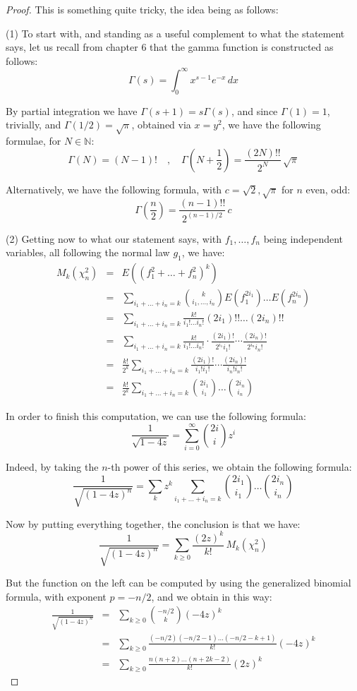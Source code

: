 \documentclass[12pt]{amsbook}
\begin{document}
\begin{proof}
This is something quite tricky, the idea being as follows:

\medskip

(1) To start with, and standing as a useful complement to what the statement says, let us recall from chapter 6 that the gamma function is constructed as follows:
$$\Gamma(s)=\int_0^\infty x^{s-1}e^{-x}\,dx$$

By partial integration we have $\Gamma(s+1)=s\Gamma(s)$, and since $\Gamma(1)=1$, trivially, and $\Gamma(1/2)=\sqrt{\pi}$, obtained via $x=y^2$, we have the following formulae, for $N\in\mathbb N$:
$$\Gamma(N)=(N-1)!\quad,\quad\Gamma\left(N+\frac{1}{2}\right)=\frac{(2N)!!}{2^N}\,\sqrt{\pi}$$

Alternatively, we have the following formula, with $c=\sqrt{2},\sqrt{\pi}$ for $n$ even, odd:
$$\Gamma\left(\frac{n}{2}\right)=\frac{(n-1)!!}{2^{(n-1)/2}}\,c$$

(2) Getting now to what our statement says, with $f_1,\ldots,f_n$ being independent variables, all following the normal law $g_1$, we have:
\begin{eqnarray*}
M_k(\chi_n^2)
&=&E((f_1^2+\ldots+f_n^2)^k)\\
&=&\sum_{i_1+\ldots+i_n=k}\binom{k}{i_1,\ldots,i_n}E(f_1^{2i_1})\ldots E(f_n^{2i_n})\\
&=&\sum_{i_1+\ldots+i_n=k}\frac{k!}{i_1!\ldots i_n!}(2i_1)!!\ldots(2i_n)!!\\
&=&\sum_{i_1+\ldots+i_n=k}\frac{k!}{i_1!\ldots i_n!}\cdot\frac{(2i_1)!}{2^{i_1}i_1!}\cdots\frac{(2i_n)!}{2^{i_n}i_n!}\\
&=&\frac{k!}{2^k}\sum_{i_1+\ldots+i_n=k}\frac{(2i_1)!}{i_1!i_1!}\cdots\frac{(2i_n)!}{i_n!i_n!}\\
&=&\frac{k!}{2^k}\sum_{i_1+\ldots+i_n=k}\binom{2i_1}{i_1}\ldots\binom{2i_n}{i_n}
\end{eqnarray*}

In order to finish this computation, we can use the following formula:
$$\frac{1}{\sqrt{1-4z}}=\sum_{i=0}^\infty\binom{2i}{i}z^i$$

Indeed, by taking the $n$-th power of this series, we obtain the following formula:
$$\frac{1}{\sqrt{(1-4z)^n}}
=\sum_kz^k\sum_{i_1+\ldots+i_n=k}\binom{2i_1}{i_1}\ldots\binom{2i_n}{i_n}$$

Now by putting everything together, the conclusion is that we have:
$$\frac{1}{\sqrt{(1-4z)^n}}
=\sum_{k\geq0}\frac{(2z)^k}{k!}\,M_k(\chi_n^2)$$

But the function on the left can be computed by using the generalized binomial formula, with exponent $p=-n/2$, and we obtain in this way:
\begin{eqnarray*}
\frac{1}{\sqrt{(1-4z)^n}}
&=&\sum_{k\geq0}\binom{-n/2}{k}(-4z)^k\\
&=&\sum_{k\geq0}\frac{(-n/2)(-n/2-1)\ldots(-n/2-k+1)}{k!}(-4z)^k\\
&=&\sum_{k\geq0}\frac{n(n+2)\ldots(n+2k-2)}{k!}(2z)^k
\end{eqnarray*}


\end{proof}
\end{document}
